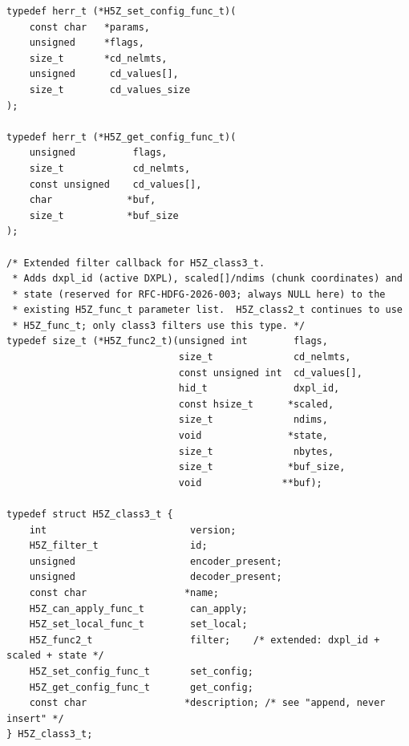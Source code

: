 \documentclass[../RFC-HDFG-2026-001.tex]{subfiles}
\begin{document}
\begin{verbatim}
typedef herr_t (*H5Z_set_config_func_t)(
    const char   *params,
    unsigned     *flags,
    size_t       *cd_nelmts,
    unsigned      cd_values[],
    size_t        cd_values_size
);

typedef herr_t (*H5Z_get_config_func_t)(
    unsigned          flags,
    size_t            cd_nelmts,
    const unsigned    cd_values[],
    char             *buf,
    size_t           *buf_size
);

/* Extended filter callback for H5Z_class3_t.
 * Adds dxpl_id (active DXPL), scaled[]/ndims (chunk coordinates) and
 * state (reserved for RFC-HDFG-2026-003; always NULL here) to the
 * existing H5Z_func_t parameter list.  H5Z_class2_t continues to use
 * H5Z_func_t; only class3 filters use this type. */
typedef size_t (*H5Z_func2_t)(unsigned int        flags,
                              size_t              cd_nelmts,
                              const unsigned int  cd_values[],
                              hid_t               dxpl_id,
                              const hsize_t      *scaled,
                              size_t              ndims,
                              void               *state,
                              size_t              nbytes,
                              size_t             *buf_size,
                              void              **buf);

typedef struct H5Z_class3_t {
    int                         version;
    H5Z_filter_t                id;
    unsigned                    encoder_present;
    unsigned                    decoder_present;
    const char                 *name;
    H5Z_can_apply_func_t        can_apply;
    H5Z_set_local_func_t        set_local;
    H5Z_func2_t                 filter;    /* extended: dxpl_id + scaled + state */
    H5Z_set_config_func_t       set_config;
    H5Z_get_config_func_t       get_config;
    const char                 *description; /* see "append, never insert" */
} H5Z_class3_t;
\end{verbatim}
\end{document}
